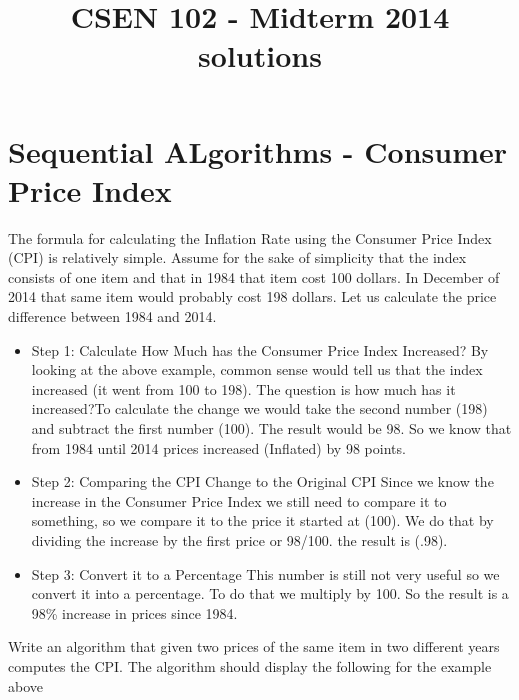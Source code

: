 \documentclass[11pt,a4paper]{article}
\begin{document}
\title{CSEN 102 - Midterm 2014 solutions}
\maketitle

\section{Sequential ALgorithms - Consumer Price Index}
The formula for calculating the Inflation Rate using the Consumer Price Index (CPI) is relatively simple.
Assume for the sake of simplicity that the index consists of one item and that in 1984 that item cost 100 dollars. In
December of 2014 that same item would probably cost 198 dollars.
Let us calculate the price difference between 1984 and 2014.


\begin{itemize}
  \item Step 1: Calculate How Much has the Consumer Price Index Increased?
By looking at the above example, common sense would tell us that the index increased (it went from 100 to
198). The question is how much has it increased?To calculate the change we would take the second number (198) and subtract the first number (100). The
result would be 98. So we know that from 1984 until 2014 prices increased (Inflated) by 98 points.

  \item Step 2: Comparing the CPI Change to the Original CPI
Since we know the increase in the Consumer Price Index we still need to compare it to something, so we
compare it to the price it started at (100). We do that by dividing the increase by the first price or 98/100. the
result is (.98).

  \item Step 3: Convert it to a Percentage
This number is still not very useful so we convert it into a percentage. To do that we multiply by 100.
So the result is a 98\% increase in prices since 1984.

\end{itemize}

Write an algorithm that given two prices of the same item in two different years computes the CPI. The algorithm
should display the following for the example above
\end{document}
